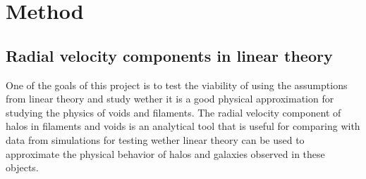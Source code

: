 \chapter{Method}\label{sec:method}
\section{Radial velocity components in linear theory}\label{sec:radlintheory}
One of the goals of this project is to test the viability of using the assumptions
from linear theory and study wether it is a good physical approximation for
studying the physics of voids and filaments. The radial velocity component of
halos in filaments and voids is an analytical tool that is useful for comparing
with data from simulations for testing wether linear theory can be used to
approximate the physical behavior of halos and galaxies observed in these objects.
